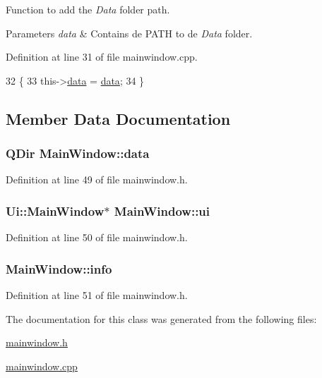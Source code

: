 Function to add the {\itshape Data} folder path. 


\begin{DoxyParams}{Parameters}
{\em data} & Contains de P\+A\+T\+H to de {\itshape Data} folder. \\
\hline
\end{DoxyParams}


Definition at line 31 of file mainwindow.\+cpp.


\begin{DoxyCode}
32 \{
33     this->\hyperlink{class_main_window_a1dc35bda22acc11636be809539ab73d9}{data} = \hyperlink{class_main_window_a1dc35bda22acc11636be809539ab73d9}{data};
34 \}
\end{DoxyCode}


\subsection{Member Data Documentation}
\hypertarget{class_main_window_a1dc35bda22acc11636be809539ab73d9}{
\subsubsection[{data}]{\setlength{\rightskip}{0pt plus 5cm}Q\+Dir Main\+Window\+::data\hspace{0.3cm}{\ttfamily [private]}}}\label{class_main_window_a1dc35bda22acc11636be809539ab73d9}


Definition at line 49 of file mainwindow.\+h.

\hypertarget{class_main_window_a35466a70ed47252a0191168126a352a5}{
\subsubsection[{ui}]{\setlength{\rightskip}{0pt plus 5cm}Ui\+::\+Main\+Window$\ast$ Main\+Window\+::ui\hspace{0.3cm}{\ttfamily [private]}}}\label{class_main_window_a35466a70ed47252a0191168126a352a5}


Definition at line 50 of file mainwindow.\+h.

\hypertarget{class_main_window_a2d1f101eed410e692b5db9b7226174bf}{
\subsubsection[{info}]{ Main\+Window\+::info\hspace{0.3cm}{\ttfamily [private]}}}\label{class_main_window_a2d1f101eed410e692b5db9b7226174bf}


Definition at line 51 of file mainwindow.\+h.



The documentation for this class was generated from the following files\+:\begin{DoxyCompactItemize}
\item 
\hyperlink{mainwindow_8h}{mainwindow.\+h}\item 
\hyperlink{mainwindow_8cpp}{mainwindow.\+cpp}\end{DoxyCompactItemize}
